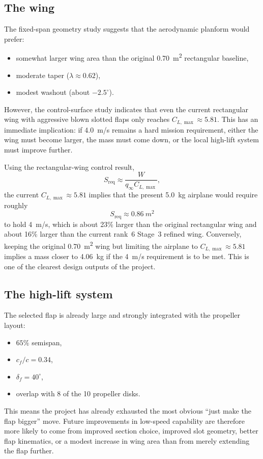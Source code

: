 \documentclass[conf]{new-aiaa}
\begin{document}
\subsection{The wing}

The fixed-span geometry study suggests that the aerodynamic planform would prefer:
\begin{itemize}
\item somewhat larger wing area than the original \SI{0.70}{m^2} rectangular baseline,
\item moderate taper (\(\lambda \approx 0.62\)),
\item modest washout (about \(-2.5^\circ\)).
\end{itemize}
However, the control-surface study indicates that even the current rectangular wing with aggressive blown slotted flaps only reaches \(C_{L,\max}\approx 5.81\). This has an immediate implication: if \SI{4.0}{m/s} remains a hard mission requirement, either the wing must become larger, the mass must come down, or the local high-lift system must improve further.

Using the rectangular-wing control result,
\begin{equation}
S_{\mathrm{req}} \approx \frac{W}{q_\infty C_{L,\max}},
\end{equation}
the current \(C_{L,\max}\approx 5.81\) implies that the present \SI{5.0}{kg} airplane would require roughly
\begin{equation}
S_{\mathrm{req}} \approx \SI{0.86}{m^2}
\end{equation}
to hold \SI{4}{m/s}, which is about 23\% larger than the original rectangular wing and about 16\% larger than the current rank~6 Stage~3 refined wing. Conversely, keeping the original \SI{0.70}{m^2} wing but limiting the airplane to \(C_{L,\max}\approx 5.81\) implies a mass closer to \SI{4.06}{kg} if the \SI{4}{m/s} requirement is to be met. This is one of the clearest design outputs of the project.

\subsection{The high-lift system}

The selected flap is already large and strongly integrated with the propeller layout:
\begin{itemize}
\item \(65\%\) semispan,
\item \(c_f/c = 0.34\),
\item \(\delta_f = 40^\circ\),
\item overlap with 8 of the 10 propeller disks.
\end{itemize}
This means the project has already exhausted the most obvious ``just make the flap bigger'' move. Future improvements in low-speed capability are therefore more likely to come from improved section choice, improved slot geometry, better flap kinematics, or a modest increase in wing area than from merely extending the flap further.
\end{document}
